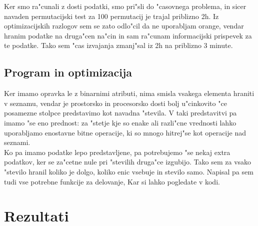 \documentclass[a4paper,11pt]{article}
\begin{document}
Ker smo ra"cunali z dosti podatki, smo pri"sli do "casovnega problema, in sicer navaden permutacijski test za 100 permutacij je trajal priblizno 2h. Iz optimizacijskih razlogov sem se zato odlo"cil da ne uporabljam orange, vendar hranim podatke na druga"cen na"cin in sam ra"cunam informacijski prispevek za te podatke. Tako sem "cas izvajanja zmanj"sal iz 2h na priblizno 3 minute. 

\subsection{Program in optimizacija}

Ker imamo opravka le z binarnimi atributi, nima smisla vsakega elementa hraniti v seznamu, vendar je prostorsko in procesorsko dosti bolj u"cinkovito "ce posamezne stolpce predstavimo kot navadna "stevila. V taki predstavitvi pa imamo "se eno prednost: za "stetje kje so enake ali razli"cne vrednosti lahko uporabljamo enostavne bitne operacije, ki so mnogo hitrej"se kot operacije nad seznami.\\

Ko pa imamo podatke lepo predstavljene, pa potrebujemo "se nekaj extra podatkov, ker se za"cetne nule pri "stevilih druga"ce izgubijo. Tako sem za vsako "stevilo hranil koliko je dolgo, koliko enic vsebuje in stevilo samo. Napisal pa sem tudi vse potrebne funkcije za delovanje, Kar si lahko pogledate v kodi.



\section{Rezultati}
\end{document}

